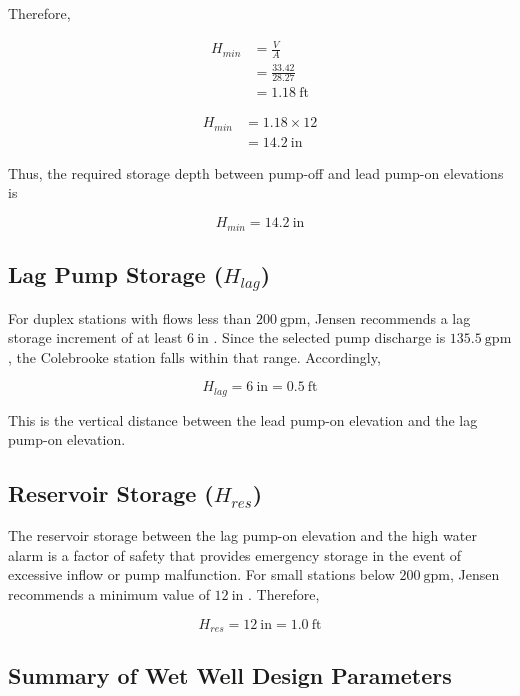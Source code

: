 Therefore,

\[
\begin{aligned}
H_{min} &= \frac{V}{A} \\
&= \frac{33.42}{28.27} \\
&= 1.18~\text{ft}
\end{aligned}
\]

\[
\begin{aligned}
H_{min} &= 1.18\times 12 \\
&= 14.2~\text{in}
\end{aligned}
\]

Thus, the required storage depth between pump-off and lead pump-on elevations is

\[
\boxed{H_{min}=14.2~\text{in}}
\]

\subsection{Lag Pump Storage ($H_{lag}$)}

For duplex stations with flows less than $200~\text{gpm}$, Jensen recommends a lag storage increment of at least $6~\text{in}$ \cite{Jensen_PumpStationDesignGuidelines_2012}. Since the selected pump discharge is $135.5~\text{gpm}$, the Colebrooke station falls within that range. Accordingly,

\[
\boxed{H_{lag}=6~\text{in}=0.5~\text{ft}}
\]

This is the vertical distance between the lead pump-on elevation and the lag pump-on elevation.

\subsection{Reservoir Storage ($H_{res}$)}

The reservoir storage between the lag pump-on elevation and the high water alarm is a factor of safety that provides emergency storage in the event of excessive inflow or pump malfunction. For small stations below $200~\text{gpm}$, Jensen recommends a minimum value of $12~\text{in}$ \cite{Jensen_PumpStationDesignGuidelines_2012}. Therefore,

\[
\boxed{H_{res}=12~\text{in}=1.0~\text{ft}}
\]

\subsection{Summary of Wet Well Design Parameters}

